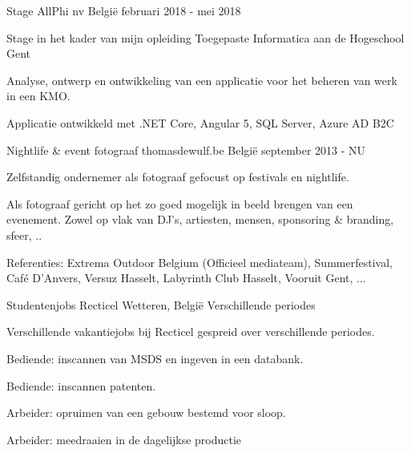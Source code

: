 


\begin{cventries}


\cventry
{Stage} %
{AllPhi nv} %
{België} %
{februari 2018 - mei 2018} %
{ %
\begin{cvitems}
\item {Stage in het kader van mijn opleiding Toegepaste Informatica aan de Hogeschool Gent }
\item {Analyse, ontwerp en ontwikkeling van een applicatie voor het beheren van werk in een KMO.}
\item {Applicatie ontwikkeld met .NET Core, Angular 5, SQL Server, Azure AD B2C}
\end{cvitems}
}

\cventry
{Nightlife \& event fotograaf} %
{thomasdewulf.be} %
{België} %
{september 2013 - NU} %
{ %
\begin{cvitems}
\item {Zelfstandig ondernemer als fotograaf gefocust op festivals en nightlife. }
\item {Als fotograaf gericht op het zo goed mogelijk in beeld brengen van een evenement. Zowel op vlak van DJ's, artiesten, mensen, sponsoring \& branding, sfeer, ..}
\item {Referenties: Extrema Outdoor Belgium (Officieel mediateam), Summerfestival, Café D'Anvers, Versuz Hasselt, Labyrinth Club Hasselt, Vooruit Gent, ...}
\end{cvitems}
}


\cventry
{Studentenjobs} %
{Recticel} %
{Wetteren, België} %
{Verschillende periodes } %
{ %
\begin{cvitems}
\item {Verschillende vakantiejobs bij Recticel gespreid over verschillende periodes.}
\item {Bediende: inscannen van MSDS en ingeven in een databank.}
\item {Bediende: inscannen patenten.}
\item {Arbeider: opruimen van een gebouw bestemd voor sloop.}
\item {Arbeider: meedraaien in de dagelijkse productie}
\end{cvitems}
}



\end{cventries}